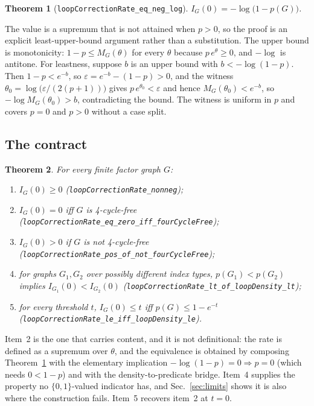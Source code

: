 \documentclass[aps,prx,reprint,nofootinbib,floatfix]{revtex4-2}
\newtheorem{thm}{Theorem}
\begin{document}
\begin{thm}[\texttt{loopCorrectionRate\_eq\_neg\_log}]
\label{thm:legendre}
$I_G(0) = -\log\bigl(1 - p(G)\bigr)$.
\end{thm}

The value is a supremum that is not attained when $p > 0$, so the proof is an
explicit least-upper-bound argument rather than a substitution. The upper bound
is monotonicity: $1 - p \leq M_G(\theta)$ for every $\theta$ because
$p\,e^\theta \geq 0$, and $-\log$ is antitone. For leastness, suppose $b$ is an
upper bound with $b < -\log(1-p)$. Then $1 - p < e^{-b}$, so
$\varepsilon = e^{-b} - (1-p) > 0$, and the witness
$\theta_0 = \log\bigl(\varepsilon / (2(p+1))\bigr)$ gives
$p\,e^{\theta_0} < \varepsilon$ and hence $M_G(\theta_0) < e^{-b}$, so
$-\log M_G(\theta_0) > b$, contradicting the bound. The witness is uniform in
$p$ and covers $p = 0$ and $p > 0$ without a case split.

\subsection{The contract}

\begin{thm}
\label{thm:contract}
For every finite factor graph $G$:
\begin{enumerate}
\item $I_G(0) \geq 0$ \textup{(\texttt{loopCorrectionRate\_nonneg})};
\item $I_G(0) = 0$ iff $G$ is 4-cycle-free
  \textup{(\texttt{loopCorrectionRate\_eq\_zero\_iff\_fourCycleFree})};
\item $I_G(0) > 0$ if $G$ is not 4-cycle-free
  \textup{(\texttt{loopCorrectionRate\_pos\_of\_not\_fourCycleFree})};
\item for graphs $G_1, G_2$ over possibly \emph{different} index types,
  $p(G_1) < p(G_2)$ implies $I_{G_1}(0) < I_{G_2}(0)$
  \textup{(\texttt{loopCorrectionRate\_lt\_of\_loopDensity\_lt})};
\item for every threshold $t$, $I_G(0) \leq t$ iff $p(G) \leq 1 - e^{-t}$
  \textup{(\texttt{loopCorrectionRate\_le\_iff\_loopDensity\_le})}.
\end{enumerate}
\end{thm}

Item~2 is the one that carries content, and it is not definitional: the rate is
defined as a supremum over $\theta$, and the equivalence is obtained by
composing Theorem~\ref{thm:legendre} with the elementary implication
$-\log(1-p) = 0 \Rightarrow p = 0$ (which needs $0 < 1-p$) and with the
density-to-predicate bridge. Item~4 supplies the property no
$\{0,1\}$-valued indicator has, and Sec.~\ref{sec:limits} shows it is also
where the construction fails. Item~5 recovers item~2 at $t = 0$.
\end{document}
